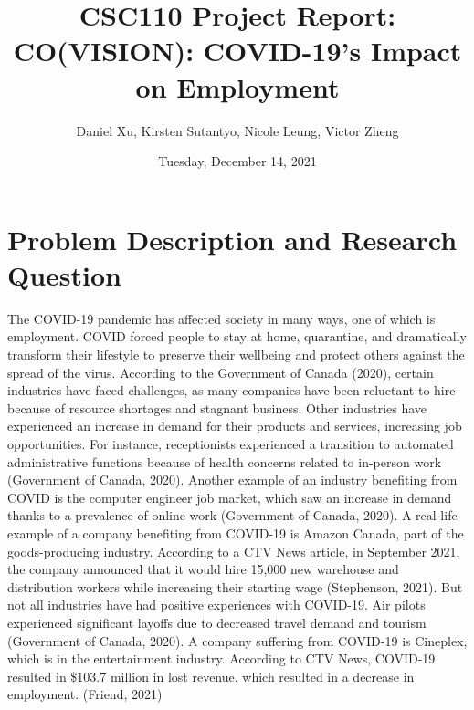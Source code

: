 \documentclass[fontsize=11pt]{article}
\title{CSC110 Project Report: CO(VISION): COVID-19’s Impact on Employment}
\author{Daniel Xu, Kirsten Sutantyo, Nicole Leung, Victor Zheng}
\date{Tuesday, December 14, 2021}
\begin{document}
\maketitle

\section{Problem Description and Research Question}

The COVID-19 pandemic has affected society in many ways, one of which is employment. COVID forced people to stay at home, quarantine, and dramatically transform their lifestyle to preserve their wellbeing and protect others against the spread of the virus. According to the Government of Canada (2020), certain industries have faced challenges, as many companies have been reluctant to hire because of resource shortages and stagnant business. Other industries have experienced an increase in demand for their products and services, increasing job opportunities. For instance, receptionists experienced a transition to automated administrative functions because of health concerns related to in-person work (Government of Canada, 2020). Another example of an industry benefiting from COVID is the computer engineer job market, which saw an increase in demand thanks to a prevalence of online work  (Government of Canada, 2020). A real-life example of a company benefiting from COVID-19 is Amazon Canada, part of the goods-producing industry. According to a CTV News article, in September 2021, the company announced that it would hire 15,000 new warehouse and distribution workers while increasing their starting wage (Stephenson, 2021). But not all industries have had positive experiences with COVID-19. Air pilots experienced significant layoffs due to decreased travel demand and tourism (Government of Canada, 2020). A company suffering from COVID-19 is Cineplex, which is in the entertainment industry. According to CTV News, COVID-19 resulted in \$103.7 million in lost revenue, which resulted in a decrease in employment. (Friend, 2021)  \newline

\end{document}
